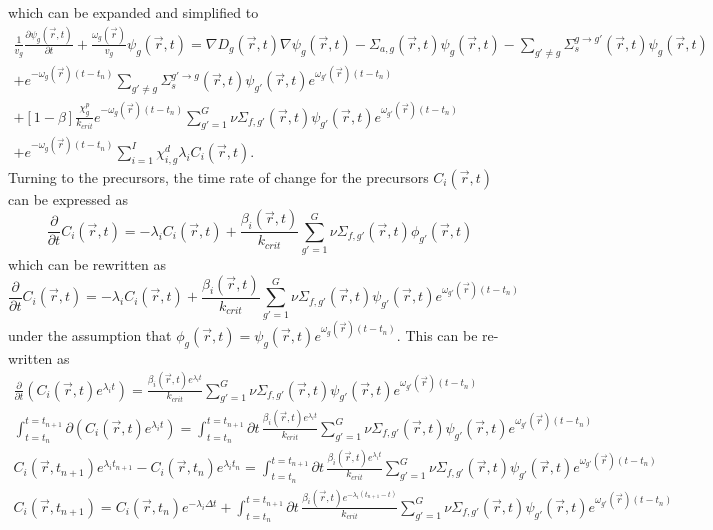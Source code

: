 \documentclass[12pt]{report}
\begin{document}
	which can be expanded and simplified to
	\begin{eqnarray}
	\frac{1}{v_g} \frac{\partial \psi_g(\vec{r},t)}{\partial t} + \frac{\omega_g(\vec{r})}{v_g} \psi_g(\vec{r},t)  = \nabla D_g(\vec{r},t) \nabla \psi_g(\vec{r},t) - \Sigma_{a,g}(\vec{r},t) \psi_g(\vec{r},t) -  \sum_{g'\neq g} \Sigma_{s}^{g\rightarrow g'} (\vec{r},t) \psi_g(\vec{r},t) \nonumber \\ + e^{-\omega_g(\vec{r}) (t-t_n)} \sum_{g' \neq g} \Sigma_{s}^{g'\rightarrow g} (\vec{r},t) \psi_{g'}(\vec{r},t) e^{\omega_{g'}(\vec{r}) (t-t_n)} \nonumber \\
	+ \left[ 1- \beta \right] \frac{\chi_g^p}{k_{crit}} e^{-\omega_g(\vec{r}) (t-t_n)} \sum_{g'=1}^{G} \nu \Sigma_{f,g'}(\vec{r},t) \psi_{g'}(\vec{r},t) e^{\omega_{g'}(\vec{r}) (t-t_n)} \nonumber \\ + e^{-\omega_g(\vec{r}) (t-t_n)} \sum_{i=1}^{I} \chi_{i,g}^d \lambda_i C_i(\vec{r},t) \nonumber.
	\end{eqnarray}
	Turning to the precursors, the time rate of change for the precursors $C_i(\vec{r},t)$ can be expressed as
	\begin{equation}
	\frac{\partial}{\partial t} C_i(\vec{r},t) = -\lambda_i C_i(\vec{r},t) + \frac{\beta_i(\vec{r},t)}{k_{crit}} \sum_{g'=1}^{G} \nu \Sigma_{f,g'}(\vec{r},t) \phi_{g'}(\vec{r},t) \nonumber
	\end{equation}
	which can be rewritten as
	\begin{equation}
	\frac{\partial}{\partial t} C_i(\vec{r},t) = -\lambda_i C_i(\vec{r},t) + \frac{\beta_i(\vec{r},t)}{k_{crit}} \sum_{g'=1}^{G} \nu \Sigma_{f,g'}(\vec{r},t) \psi_{g'}(\vec{r},t) e^{\omega_{g'}(\vec{r}) (t-t_n)} \nonumber
	\end{equation}
	under the assumption that $\phi_g(\vec{r},t) = \psi_g(\vec{r},t) e^{\omega_g(\vec{r}) (t-t_n)}$. This can be re-written as
	\begin{eqnarray}
	\frac{\partial}{\partial t} \left( C_i(\vec{r},t) e^{\lambda_i t} \right) = \frac{\beta_i(\vec{r},t) e^{\lambda_i t}}{k_{crit}} \sum_{g'=1}^{G} \nu \Sigma_{f,g'}(\vec{r},t) \psi_{g'}(\vec{r},t) e^{\omega_{g'}(\vec{r}) (t-t_n)} \nonumber \\
	\int_{t=t_n}^{t=t_{n+1}} \partial \left( C_i(\vec{r},t) e^{\lambda_i t} \right) = \int_{t=t_n}^{t=t_{n+1}}  \partial t \, \frac{\beta_i(\vec{r},t) e^{\lambda_i t}}{k_{crit}} \sum_{g'=1}^{G} \nu \Sigma_{f,g'}(\vec{r},t) \psi_{g'}(\vec{r},t) e^{\omega_{g'}(\vec{r}) (t-t_n)} \nonumber \\
	 C_i(\vec{r},t_{n+1}) e^{\lambda_i t_{n+1}} - C_i(\vec{r},t_{n}) e^{\lambda_i t_{n}} = \int_{t=t_n}^{t=t_{n+1}}  \partial t \, \frac{\beta_i(\vec{r},t) e^{\lambda_i t}}{k_{crit}} \sum_{g'=1}^{G} \nu \Sigma_{f,g'}(\vec{r},t) \psi_{g'}(\vec{r},t) e^{\omega_{g'}(\vec{r}) (t-t_n)} \nonumber \\
	 C_i(\vec{r},t_{n+1}) =  C_i(\vec{r},t_{n}) e^{-\lambda_i \Delta t} +  \int_{t=t_n}^{t=t_{n+1}}  \partial t \, \frac{\beta_i(\vec{r},t) e^{-\lambda_i \left(t_{n+1} - t \right)}}{k_{crit}} \sum_{g'=1}^{G} \nu \Sigma_{f,g'}(\vec{r},t) \psi_{g'}(\vec{r},t) e^{\omega_{g'}(\vec{r}) (t-t_n)} \nonumber
	\end{eqnarray}	
\end{document}
